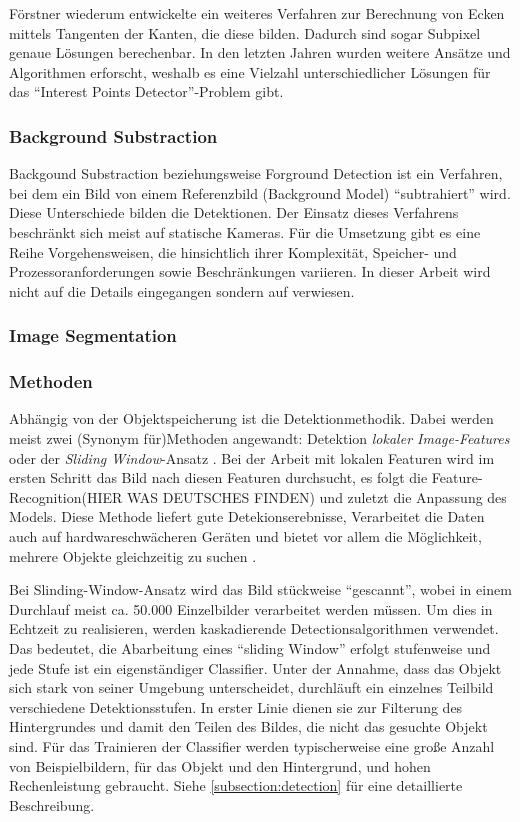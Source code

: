 Förstner \cite{FOD} wiederum entwickelte ein weiteres Verfahren zur Berechnung von Ecken mittels Tangenten der Kanten, die diese bilden. Dadurch sind sogar Subpixel genaue Lösungen berechenbar. In den letzten Jahren wurden weitere Ansätze und Algorithmen erforscht, weshalb es eine Vielzahl unterschiedlicher Lösungen für das ``Interest Points Detector''-Problem gibt.

\subsubsection{Background Substraction}
Backgound Substraction beziehungsweise Forground Detection ist ein Verfahren, bei dem ein Bild von einem Referenzbild (Background Model) ``subtrahiert'' wird. Diese Unterschiede bilden die Detektionen. Der Einsatz dieses Verfahrens beschränkt sich meist auf statische Kameras. Für die Umsetzung gibt es eine Reihe Vorgehensweisen, die hinsichtlich ihrer Komplexität, Speicher- und Prozessoranforderungen sowie Beschränkungen variieren. In dieser Arbeit wird nicht auf die Details eingegangen sondern auf \cite{BAG} verwiesen.

\subsubsection{Image Segmentation}

\subsubsection{Methoden}
Abhängig von der Objektspeicherung ist die Detektionmethodik. Dabei werden meist zwei (Synonym für)Methoden angewandt: Detektion \textit{lokaler Image-Features}\cite{IMF} oder der \textit{Sliding Window}-Ansatz \cite{IIM}.
Bei der Arbeit mit lokalen Featuren wird im ersten Schritt das Bild nach diesen Featuren durchsucht, es folgt die Feature-Recognition(HIER WAS DEUTSCHES FINDEN) und zuletzt die Anpassung des Models. Diese Methode liefert gute Detekionserebnisse, Verarbeitet die Daten auch auf hardwareschwächeren Geräten und bietet vor allem die Möglichkeit, mehrere Objekte gleichzeitig zu suchen\cite{MTL} \cite{VAH} \cite{SLI}.

Bei Slinding-Window-Ansatz wird das Bild stückweise ``gescannt'', wobei in einem Durchlauf meist ca. 50.000 Einzelbilder verarbeitet werden müssen. Um dies in Echtzeit zu realisieren, werden kaskadierende Detectionsalgorithmen verwendet. Das bedeutet, die Abarbeitung eines ``sliding Window'' erfolgt stufenweise und jede Stufe ist ein eigenständiger Classifier. Unter der Annahme, dass das Objekt sich stark von seiner Umgebung unterscheidet, durchläuft ein einzelnes Teilbild verschiedene Detektionsstufen. In erster Linie dienen sie zur Filterung des Hintergrundes und damit den Teilen des Bildes, die nicht das gesuchte Objekt sind. Für das Trainieren der Classifier werden typischerweise eine große Anzahl von Beispielbildern, für das Objekt und den Hintergrund, und hohen Rechenleistung gebraucht. Siehe \ref{subsection:detection} für eine detaillierte Beschreibung.


